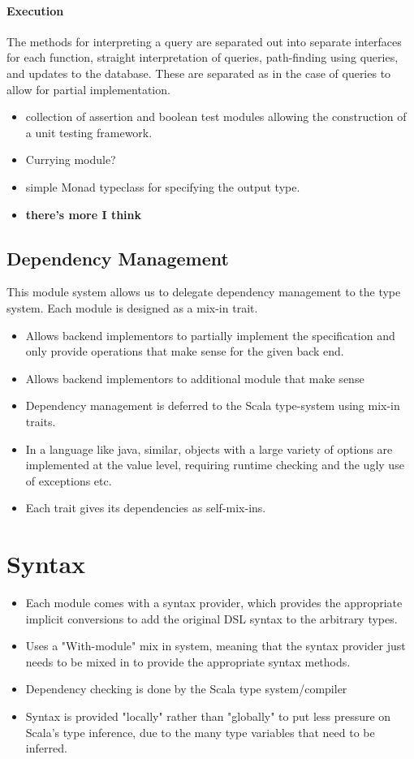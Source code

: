\documentclass{report}
\newcommand \2[0]{\textbf{2}}
\newcommand \3[0]{\textbf{3}}
\newcommand{\todo}[1]{\textbf{#1}}
\begin{document}
\paragraph{Execution}
The methods for interpreting a query are separated out into separate interfaces for each function, straight interpretation of queries, path-finding using queries, and updates to the database. These are separated as in the case of queries to allow for partial implementation.

\begin{itemize}
    \item collection of assertion and boolean test modules allowing the construction of a unit testing framework.
    \item Currying module?
    \item simple Monad typeclass for specifying the output type.
    \item \todo{there's more  I think}
\end{itemize}

\subsection{Dependency Management}
This module system allows us to delegate dependency management to the type system. Each module is designed as a mix-in trait.

\begin{itemize}
\item Allows backend implementors to partially implement the specification and only provide operations that make sense for the given back end.
\item Allows backend implementors to additional module that make sense
\item Dependency management is deferred to the Scala type-system using mix-in traits.
\item In a language like java, similar, objects with a large variety of options are implemented at the value level, requiring runtime checking and the ugly use of exceptions etc.
\item Each trait gives its dependencies as self-mix-ins.
\end{itemize}

\section{Syntax}
\begin{itemize}
    \item Each module comes with a syntax provider, which provides the appropriate implicit conversions to add the original DSL syntax to the arbitrary types.
    \item Uses a "With-module" mix in system, meaning that the syntax provider just needs to be mixed in to provide the appropriate syntax methods.
    \item Dependency checking is done by the Scala type system/compiler
    \item Syntax is provided "locally" rather than "globally" to put less pressure on Scala's type inference, due to the many type variables that need to be inferred.
\end{itemize}
\end{document}
